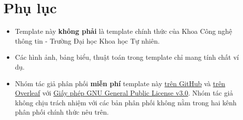 \section{Phụ lục}
\begin{itemize}
\item Template này \textbf{không phải} là template chính thức của Khoa Công nghệ thông tin - Trường Đại học Khoa học Tự nhiên.
\item Các hình ảnh, bảng biểu, thuật toán trong template chỉ mang tính chất ví dụ.
\item Nhóm tác giả phân phối \textbf{miễn phí} template này \href{https://github.com/khongsomeo/hcmus-unofficial-report-template}{trên GitHub} và \href{https://www.overleaf.com/latex/templates/hcmus-report-template/zyrhmsxynwqs}{trên Overleaf} với \href{https://github.com/khongsomeo/hcmus-unofficial-report-template/blob/main/LICENSE}{Giấy phép GNU General Public License v3.0}. Nhóm tác giả không chịu trách nhiệm với các bản phân phối không nằm trong hai kênh phân phối chính thức nêu trên.
\end{itemize}
